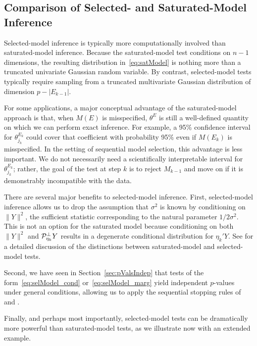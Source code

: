 \documentclass{article}
\begin{document}
\subsection{Comparison of Selected- and Saturated-Model Inference}\label{sec:bivariate}


Selected-model inference is typically more computationally involved than saturated-model inference. Because the saturated-model test conditions on $n-1$ dimensions, the resulting distribution in~\eqref{eq:satModel} is nothing more than a truncated univariate Gaussian random variable. By contrast, selected-model tests typically require sampling from a truncated multivariate Gaussian distribution of dimension $p-|E_{k-1}|$.

For some applications, a major conceptual advantage of the saturated-model approach is that, when $M(E)$ is misspecified, $\theta^{E}$ is still a well-defined quantity on which we can perform exact inference. For example, a 95\% confidence interval for $\theta_{j_k}^{E_k}$ could cover that coefficient with probability 95\% even if $M(E_k)$ is misspecified. In the setting of sequential model selection, this advantage is less important. We do not necessarily need a scientifically interpretable interval for $\theta_{j_k}^{E_k}$; rather, the goal of the test at step $k$ is to reject $M_{k-1}$ and move on if it is demonstrably incompatible with the data.

There are several major benefits to selected-model inference. First, selected-model inference allows us to drop the assumption that $\sigma^2$ is known by conditioning on $\|Y\|^2$, the sufficient statistic corresponding to the natural parameter $1/2\sigma^2$. This is not an option for the saturated model because conditioning on both $\|Y\|^2$ and $\mathcal{P}_{\eta_k}^\perp Y$ results in a degenerate conditional distribution for $\eta_k'Y$.  See \citet[][Section 5]{fithian2014optimal} for a detailed discussion of the distinctions between saturated-model and selected-model tests.

Second, we have seen in Section~\ref{sec:pValsIndep} that tests of the form~\eqref{eq:selModel_cond} or~\eqref{eq:selModel_marg} yield independent $p$-values under general conditions, allowing us to apply  the sequential stopping rules of~\citet{gsell2013sequential} and \citet{li2015accumulation}.

Finally, and perhaps most importantly, selected-model tests can be dramatically more powerful than saturated-model tests, as we illustrate now with an extended example.
\end{document}
